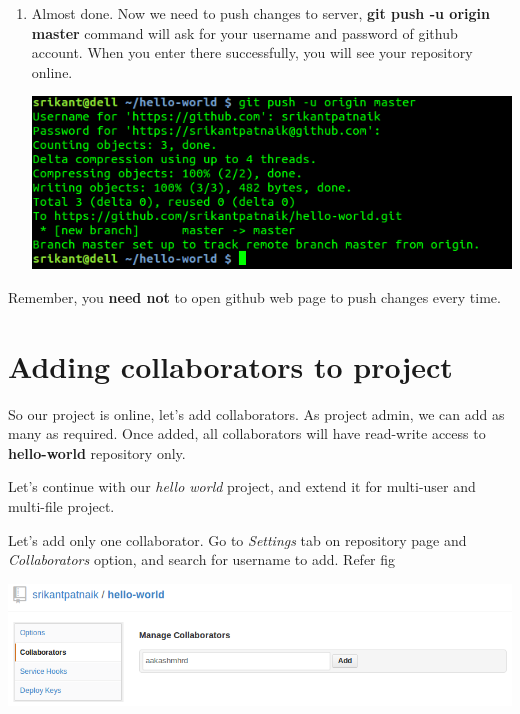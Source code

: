 \documentclass[letterpaper,10pt,english]{sphinxmanual}
\begin{document}
\begin{enumerate}
\item {} 
Almost done. Now we need to push changes to server, \textbf{git push -u origin master} command will ask for your username and password of github
account. When you enter there successfully, you will see your repository online.

\includegraphics[width=1.000\linewidth]{git-push.png}

\end{enumerate}

Remember, you \textbf{need not} to open github web page to push changes every time.

\begin{DUlineblock}{0em}
\item[] 
\item[] 
\item[] 
\end{DUlineblock}


\section{Adding collaborators to project}
\label{version-control:adding-collaborators-to-project}
So our project is online, let's add collaborators. As project admin, we can
add as many as required. Once added, all collaborators will have read-write
access to \textbf{hello-world} repository only.

Let's continue with our \emph{hello world} project, and extend it for multi-user
and multi-file project.

Let's add only one collaborator. Go to \emph{Settings} tab on repository page and
\emph{Collaborators} option, and search for username to add. Refer fig

\includegraphics[width=1.000\linewidth]{add-collaborator.png}
\end{document}
